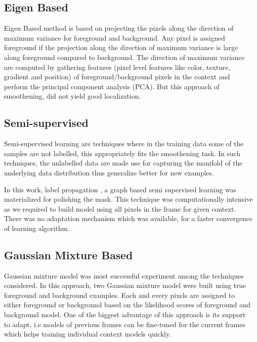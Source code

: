 \subsection{Eigen Based}
Eigen Based method is based on projecting the pixels along the direction of maximum variance for foreground and background. Any pixel is assigned foreground if the projection along the direction of maximum variance is large along foreground compared to background. The direction of maximum variance are computed by gathering features (pixel level features like color, texture, gradient and position) of foreground/background pixels in the context and perform the principal component analysis (PCA). But this approach of smoothening, did not yield good localization.

\subsection{Semi-supervised}
Semi-supervised learning are techniques where in the training data some of the samples are not labelled, this appropriately fits the smoothening task. In such techniques, the unlabelled data are made use for capturing the manifold of the underlying data distribution thus generalize better for new examples. 
\par In this work, label propagation \citep{labprop}, a graph based semi supervised learning was materialized for polishing the mask. This technique was computationally intensive as we required to build model using all pixels in the frame for given context. There was no adaptation mechanism which was available, for a faster convergence of learning algorithm.

\subsection{Gaussian Mixture Based}
Gaussian mixture model was  most successful experiment among the techniques considered.  In this approach, two Gaussian mixture model were built using true foreground and background  examples. Each and every pixels are assigned to either foreground or background based on the likelihood scores of foreground and background model. One of the biggest advantage of this approach is its support to adapt, i.e models of previous frames can be fine-tuned for the current frames which helps training individual context models quickly.

